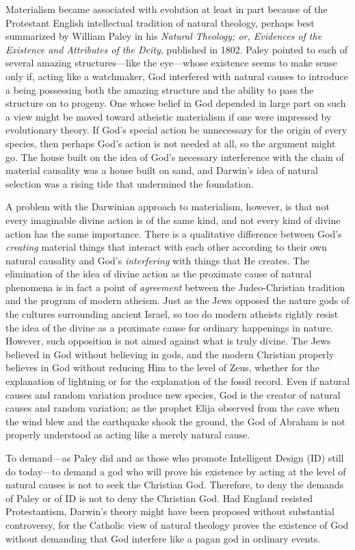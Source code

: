 \documentclass[twocolumn]{article}
\begin{document}
Materialism became associated with evolution at least in part because of the
Protestant English intellectual tradition of natural theology, perhaps best
summarized by William Paley in his {\it Natural Theology; or, Evidences of the
Existence and Attributes of the Deity}, published in 1802.  Paley pointed to
each of several amazing structures---like the eye---whose existence seems to
make sense only if, acting like a watchmaker, God interfered with natural
causes to introduce a being possessing both the amazing structure and the
ability to pass the structure on to progeny. One whose belief in God depended
in large part on such a view might be moved toward atheistic materialism if one
were impressed by evolutionary theory.  If God's special action be unnecessary
for the origin of every species, then perhaps God's action is not needed at
all, so the argument might go. The house built on the idea of God's necessary
interference with the chain of material causality was a house built on sand,
and Darwin's idea of natural selection was a rising tide that undermined the
foundation.

A problem with the Darwinian approach to materialism, however, is that not
every imaginable divine action is of the same kind, and not every kind of
divine action has the same importance. There is a qualitative difference
between God's \emph{creating} material things that interact with each other
according to their own natural causality and God's \emph{interfering} with
things that He creates. The elimination of the idea of divine action as the
proximate cause of natural phenomena is in fact a point of \emph{agreement}
between the Judeo-Christian tradition and the program of modern atheism.  Just
as the Jews opposed the nature gods of the cultures surrounding ancient Israel,
so too do modern atheists rightly resist the idea of the divine as a proximate
cause for ordinary happenings in nature.  However, such opposition is not aimed
against what is truly divine. The Jews believed in God without believing in
gods, and the modern Christian properly believes in God without reducing Him to
the level of Zeus, whether for the explanation of lightning or for the
explanation of the fossil record. Even if natural causes and random variation
produce new species, God is the creator of natural causes and random variation;
as the prophet Elija observed from the cave when the wind blew and the
earthquake shook the ground, the God of Abraham is not properly understood as
acting like a merely natural cause.

To demand---as Paley did and as those who promote Intelligent Design (ID) still
do today---to demand a god who will prove his existence by acting at the level
of natural causes is not to seek the Christian God.  Therefore, to deny the
demands of Paley or of ID is not to deny the Christian God.  Had England
resisted Protestantism, Darwin's theory might have been proposed without
substantial controversy, for the Catholic view of natural theology proves the
existence of God without demanding that God interfere like a pagan god in
ordinary events.
\end{document}
